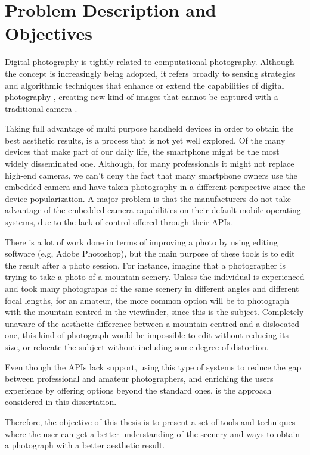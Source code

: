 \section{Problem Description and Objectives}
\label{sec:problem_description}
Digital photography is tightly related to computational photography. Although the concept is increasingly being adopted, it refers broadly to sensing strategies and algorithmic techniques that enhance or extend the capabilities of digital photography \cite{szeliski2012technical} , creating new kind of images that cannot be captured with a traditional camera \cite{pulli2009mobile}. 

Taking full advantage of multi purpose handheld devices in order to obtain the best aesthetic results, is a process that is not yet well explored. 
Of the many devices that make part of our daily life, the smartphone might be the most widely disseminated one. Although, for many professionals it might not replace high-end cameras, we can't deny the fact that many smartphone owners use the embedded camera and have taken photography in a different perspective since the device popularization. A major problem is that the manufacturers do not take advantage of the embedded camera capabilities on their default mobile operating systems, due to the lack of control offered through their APIs.

There is a lot of work done in terms of improving a photo by using editing software (e.g, Adobe Photoshop), but the main purpose of these tools is to edit the result after a photo session. For instance, imagine that a photographer is trying to take a photo of a mountain scenery. Unless the individual is experienced and took many photographs of the same scenery in different angles and different focal lengths, for an amateur, the more common option will be to photograph with the mountain centred in the viewfinder, since this is the subject. Completely unaware of the aesthetic difference between a mountain centred and a dislocated one, this kind of photograph would be impossible to edit without reducing its size, or relocate the subject without including some degree of distortion.

Even though the APIs lack  support, using this type of systems to reduce the gap between professional and amateur photographers, and enriching the users experience by offering options beyond the standard ones, is the approach considered in this dissertation.

Therefore, the objective of this thesis is to present a set of tools and techniques where the user can get a better understanding of the scenery and ways to obtain a photograph with a better aesthetic result.

